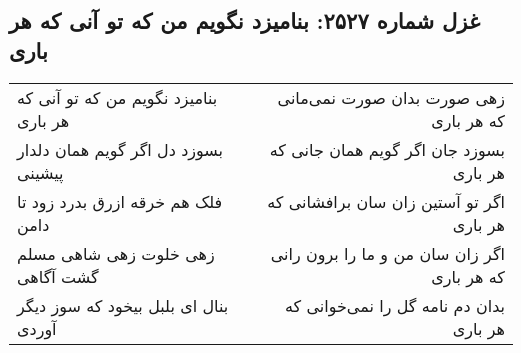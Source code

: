 \begin{center}
\section*{غزل شماره ۲۵۲۷: بنامیزد نگویم من که تو آنی که هر باری}
\label{sec:2527}
\begin{longtable}{l p{0.5cm} r}
بنامیزد نگویم من که تو آنی که هر باری
&&
زهی صورت بدان صورت نمی‌مانی که هر باری
\\
بسوزد دل اگر گویم همان دلدار پیشینی
&&
بسوزد جان اگر گویم همان جانی که هر باری
\\
فلک هم خرقه ازرق بدرد زود تا دامن
&&
اگر تو آستین زان سان برافشانی که هر باری
\\
زهی خلوت زهی شاهی مسلم گشت آگاهی
&&
اگر زان سان من و ما را برون رانی که هر باری
\\
بنال ای بلبل بیخود که سوز دیگر آوردی
&&
بدان دم نامه گل را نمی‌خوانی که هر باری
\\
\end{longtable}
\end{center}
